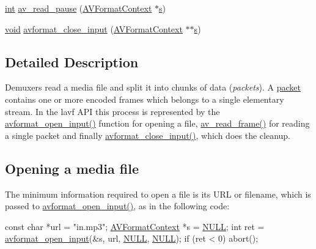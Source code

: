 \begin{DoxyCompactItemize}
\item 
\hyperlink{xmltok_8h_a5a0d4a5641ce434f1d23533f2b2e6653}{int} \hyperlink{group__lavf__decoding_ga27db687592d99f25ccf81a3b3ee8da9c}{av\+\_\+read\+\_\+pause} (\hyperlink{struct_a_v_format_context}{A\+V\+Format\+Context} $\ast$\hyperlink{lib_2expat_8h_a755339d27872b13735c2cab829e47157}{s})
\item 
\hyperlink{sound_8c_ae35f5844602719cf66324f4de2a658b3}{void} \hyperlink{group__lavf__decoding_gae804b99aec044690162b8b9b110236a4}{avformat\+\_\+close\+\_\+input} (\hyperlink{struct_a_v_format_context}{A\+V\+Format\+Context} $\ast$$\ast$\hyperlink{lib_2expat_8h_a755339d27872b13735c2cab829e47157}{s})
\end{DoxyCompactItemize}


\subsection{Detailed Description}
Demuxers read a media file and split it into chunks of data ({\itshape packets}). A \hyperlink{struct_a_v_packet}{packet} contains one or more encoded frames which belongs to a single elementary stream. In the lavf A\+PI this process is represented by the \hyperlink{group__lavf__decoding_ga10a404346c646e4ab58f4ed798baca32}{avformat\+\_\+open\+\_\+input()} function for opening a file, \hyperlink{group__lavf__decoding_ga4fdb3084415a82e3810de6ee60e46a61}{av\+\_\+read\+\_\+frame()} for reading a single packet and finally \hyperlink{group__lavf__decoding_gae804b99aec044690162b8b9b110236a4}{avformat\+\_\+close\+\_\+input()}, which does the cleanup.\hypertarget{group__lavf__decoding_lavf_decoding_open}{}\subsection{Opening a media file}\label{group__lavf__decoding_lavf_decoding_open}
The minimum information required to open a file is its U\+RL or filename, which is passed to \hyperlink{group__lavf__decoding_ga10a404346c646e4ab58f4ed798baca32}{avformat\+\_\+open\+\_\+input()}, as in the following code\+: 
\begin{DoxyCode}
\textcolor{keyword}{const} \textcolor{keywordtype}{char}    *url = \textcolor{stringliteral}{"in.mp3"};
\hyperlink{struct_a_v_format_context}{AVFormatContext} *s = \hyperlink{getopt1_8c_a070d2ce7b6bb7e5c05602aa8c308d0c4}{NULL};
\textcolor{keywordtype}{int} ret = \hyperlink{group__lavf__decoding_ga10a404346c646e4ab58f4ed798baca32}{avformat\_open\_input}(&s, url, \hyperlink{getopt1_8c_a070d2ce7b6bb7e5c05602aa8c308d0c4}{NULL}, \hyperlink{getopt1_8c_a070d2ce7b6bb7e5c05602aa8c308d0c4}{NULL});
\textcolor{keywordflow}{if} (ret < 0)
    abort();
\end{DoxyCode}
